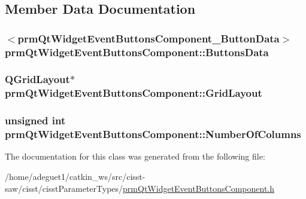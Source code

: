 \subsection{Member Data Documentation}
\hypertarget{classprm_qt_widget_event_buttons_component_abbd6470778a7d4984d42f453d5659285}{
\subsubsection[{Buttons\-Data}]{$<${\bf prm\-Qt\-Widget\-Event\-Buttons\-Component\-\_\-\-Button\-Data}$>$ prm\-Qt\-Widget\-Event\-Buttons\-Component\-::\-Buttons\-Data\hspace{0.3cm}{\ttfamily [protected]}}}\label{classprm_qt_widget_event_buttons_component_abbd6470778a7d4984d42f453d5659285}
\hypertarget{classprm_qt_widget_event_buttons_component_ae56ef90e33c283732b965a26d6e082ba}{
\subsubsection[{Grid\-Layout}]{\setlength{\rightskip}{0pt plus 5cm}Q\-Grid\-Layout$\ast$ prm\-Qt\-Widget\-Event\-Buttons\-Component\-::\-Grid\-Layout\hspace{0.3cm}{\ttfamily [protected]}}}\label{classprm_qt_widget_event_buttons_component_ae56ef90e33c283732b965a26d6e082ba}
\hypertarget{classprm_qt_widget_event_buttons_component_ae0c4a7d1cdd342fcaf745ac4fc4f9378}{
\subsubsection[{Number\-Of\-Columns}]{\setlength{\rightskip}{0pt plus 5cm}unsigned int prm\-Qt\-Widget\-Event\-Buttons\-Component\-::\-Number\-Of\-Columns\hspace{0.3cm}{\ttfamily [protected]}}}\label{classprm_qt_widget_event_buttons_component_ae0c4a7d1cdd342fcaf745ac4fc4f9378}


The documentation for this class was generated from the following file\-:\begin{DoxyCompactItemize}
\item 
/home/adeguet1/catkin\-\_\-ws/src/cisst-\/saw/cisst/cisst\-Parameter\-Types/\hyperlink{prm_qt_widget_event_buttons_component_8h}{prm\-Qt\-Widget\-Event\-Buttons\-Component.\-h}\end{DoxyCompactItemize}
